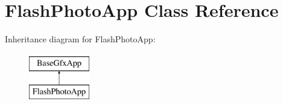 \hypertarget{classFlashPhotoApp}{}\section{Flash\+Photo\+App Class Reference}
\label{classFlashPhotoApp}
Inheritance diagram for Flash\+Photo\+App\+:\begin{figure}[H]
\begin{center}
\leavevmode
\includegraphics[height=2.000000cm]{classFlashPhotoApp}
\end{center}
\end{figure}
